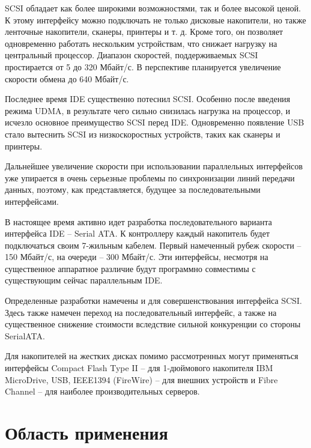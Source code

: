 \documentclass[bachelor, och, referat]{SCWorks}
\begin{document}
SCSI обладает как более широкими возможностями, так и более высокой ценой. К этому интерфейсу можно подключать не только дисковые накопители, но также ленточные накопители, сканеры, принтеры и т. д. Кроме того, он позволяет одновременно работать нескольким устройствам, что снижает нагрузку на центральный процессор. Диапазон скоростей, поддерживаемых SCSI простирается от 5 до 320 Мбайт/с. В перспективе планируется увеличение скорости обмена до 640 Мбайт/с.

Последнее время IDE существенно потеснил SCSI. Особенно после введения режима UDMA, в результате чего сильно снизилась нагрузка на процессор, и исчезло основное преимущество SCSI перед IDE. Одновременно появление USB стало вытеснить SCSI из низкоскоростных устройств, таких как сканеры и принтеры.

Дальнейшее увеличение скорости при использовании параллельных интерфейсов уже упирается в очень серьезные проблемы по синхронизации линий передачи данных, поэтому, как представляется, будущее за последовательными интерфейсами.

В настоящее время активно идет разработка последовательного варианта интерфейса IDE -- Serial ATA. К контроллеру каждый накопитель будет подключаться своим 7-жильным кабелем. Первый намеченный рубеж скорости -- 150 Мбайт/с, на очереди -- 300 Мбайт/с. Эти интерфейсы, несмотря на существенное аппаратное различие будут программно совместимы с существующим сейчас параллельным IDE.

Определенные разработки намечены и для совершенствования интерфейса SCSI. Здесь также намечен переход на последовательный интерфейс, а также на существенное снижение стоимости вследствие сильной конкуренции со стороны SerialATA.

Для накопителей на жестких дисках помимо рассмотренных могут применяться интерфейсы Compact Flash Type II -- для 1-дюймового накопителя IBM MicroDrive, USB, IEEE1394 (FireWire) -- для внешних устройств и Fibre Channel -- для наиболее производительных серверов.

\section{Область применения}
\end{document}
